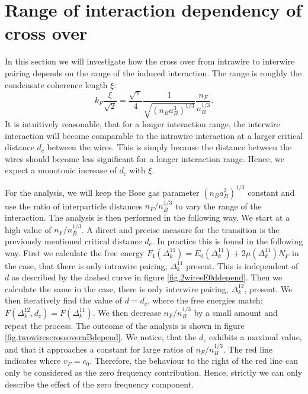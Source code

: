 \section{Range of interaction dependency of cross over}
\label{sec.2wiresrange_of_interaction_crossover}
In this section we will investigate how the cross over from intrawire to interwire pairing depends on the range of the induced interaction. The range is roughly the condensate coherence length $\xi$:
\begin{equation}
k_F\frac{\xi}{\sqrt{2}} = \frac{\sqrt{\pi}}{4}\frac{1}{\sqrt{(n_Ba_B^3)^{1/3}}}\frac{n_F}{n_B^{1/3}}.
\label{eq.RangefunctionofrBBnB}
\end{equation}
It is intuitively reasonable, that for a longer interaction range, the interwire interaction will become comparable to the intrawire interaction at a larger critical distance $d_c$ between the wires. This is simply because the distance between the wires should become less significant for a longer interaction range. Hence, we expect a monotonic increase of $d_c$ with $\xi$.   

For the analysis, we will keep the Bose gas parameter $(n_Ba_B^3)^{1/3}$ constant and use the ratio of interparticle distances $n_F/n_B^{1/3}$ to vary the range of the interaction. The analysis is then performed in the following way. We start at a high value of $n_F/n_B^{1/3}$. A direct and precise measure for the transition is the previously mentioned critical distance $d_c$. In practice this is found in the following way. First we calculate the free energy $F_1(\Delta^{11}_k) = E_0(\Delta^{11}_k) + 2 \mu (\Delta^{11}_k) N_F$ in the case, that there is only intrawire pairing, $\Delta^{11}_k$ present. This is independent of $d$ as described by the dashed curve in figure \ref{fig.2wiresE0ddepend}. Then we calculate the same in the case, there is only interwire pairing, $\Delta^{12}_k$, present. We then iteratively find the value of $d = d_c$, where the free energies match: $F(\Delta^{12}_k, d_c) = F(\Delta^{11}_k)$. We then decrease $n_F/n_B^{1/3}$ by a small amount and repeat the process. The outcome of the analysis is shown in figure \ref{fig.twowirescrossovernBdepend}. We notice, that the $d_c$ exhibits a maximal value, and that it approaches a constant for large ratios of $n_F/n_B^{1/3}$. The red line indicates where $v_F = c_0$. Therefore, the behaviour to the right of the red line can only be considered as the zero frequency contribution. Hence, strictly we can only describe the effect of the zero frequency component. 

